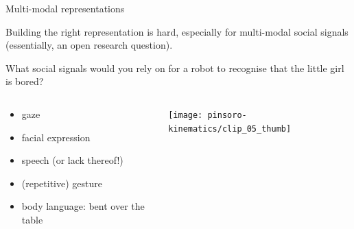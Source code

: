 \documentclass[compress]{beamer}
\begin{document}
\begin{frame}{Multi-modal representations}

    Building the right representation is hard, especially for multi-modal social
    signals (essentially, an open research
    question).

    \pause

    What social signals would you rely on for a robot to recognise that the
    little girl is bored?

    \pause

    \begin{columns}
        \begin{column}{0.5\linewidth}
    \begin{itemize}
        \item gaze
        \item facial expression
        \item speech (or lack thereof!)
        \item (repetitive) gesture
        \item body language: bent over the table
    \end{itemize}

        \end{column}
        \begin{column}{0.5\linewidth}
            \begin{center}
                \texttt{[image: pinsoro-kinematics/clip\_05\_thumb]}
            \end{center}
        \end{column}
    \end{columns}

\end{frame}
\end{document}
